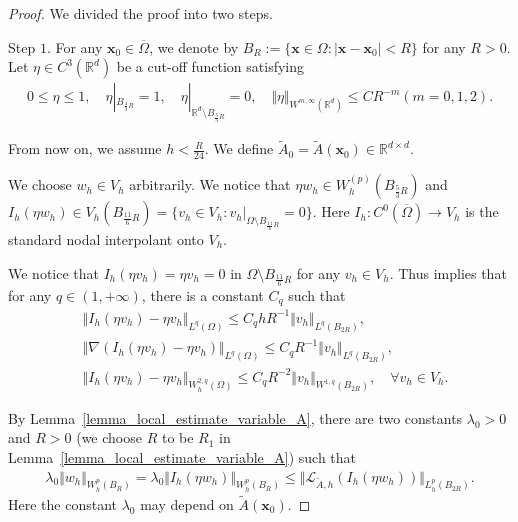 \documentclass[12pt]{amsart}
\newcommand{\boldx}{\boldsymbol{x}}
\theoremstyle{definition}
\theoremstyle{remark}
\begin{document}
\begin{proof}
We divided the proof into two steps.

Step $1$. For any $\boldx_{0} \in \overline{\Omega}$, we denote by $B_{R}:=\{ \boldx \in \Omega: 
\vert \boldx - \boldx_{0} \vert < R \}$ for any $R > 0$. Let $\eta \in C^{3}(\mathbb{R}^{d})$ be 
a cut-off function satisfying 
\begin{align}
\label{cut_off_func}
0\leq \eta \leq 1, \quad \eta|_{B_{\frac{4}{3}R}} = 1, \quad \eta|_{\mathbb{R}^{d} \setminus B_{\frac{5}{3}R}} = 0, 
\quad \Vert \eta \Vert_{W^{m,\infty}(\mathbb{R}^{d})} \leq C R^{-m} (m=0,1,2).
\end{align} 

From now on, we assume $h < \frac{R}{24}$. We define $\tilde{A}_{0} = \tilde{A}(\boldx_{0})\in \mathbb{R}^{d \times d}$. 

We choose $w_{h} \in V_{h}$ arbitrarily. We notice that $\eta w_{h} \in W_{h}^{(p)}(B_{\frac{5}{3}R})$ 
and $I_{h}(\eta w_{h}) \in V_{h}(B_{\frac{11}{6}R})=\{ v_{h} \in V_{h} : v_{h}|_{\Omega \setminus B_{\frac{11}{6} R}} = 0 \}$. 
Here $I_{h}: C^{0}(\overline{\Omega})\rightarrow V_{h}$ is the standard nodal interpolant onto $V_{h}$.

We notice that $I_{h}(\eta v_{h}) = \eta v_{h} = 0$ in $\Omega \setminus B_{\frac{11}{6}R}$ for any $v_{h} \in V_{h}$. 
Thus \cite[Lemma~$2.4$]{FHM2017} implies that for any $q \in (1, +\infty)$, there is a constant $C_{q}$ such that 
\begin{align}
\label{nodal_interpolation_error}
& \Vert I_{h}(\eta v_{h}) - \eta v_{h} \Vert_{L^{q}(\Omega)} \leq C_{q} h R^{-1} \Vert v_{h}\Vert_{L^{q}(B_{2R})},\\
\nonumber
& \Vert \nabla (I_{h}(\eta v_{h}) -\eta v_{h} ) \Vert_{L^{q}(\Omega)} 
\leq C_{q}R^{-1} \Vert v_{h} \Vert_{L^{q}( B_{2R} )}, \\
\nonumber
& \Vert I_{h}(\eta v_{h}) - \eta v_{h}\Vert_{W_{h}^{2,q}(\Omega)} 
\leq C_{q} R^{-2}\Vert v_{h} \Vert_{W^{1,q}(B_{2R})},
\quad \forall v_{h} \in V_{h}.
\end{align}

By Lemma~\ref{lemma_local_estimate_variable_A}, there are two constants $\lambda_{0}>0$ and $R > 0$ 
(we choose $R$ to be $R_{1}$ in Lemma~\ref{lemma_local_estimate_variable_A}) such that 
\begin{align}
\label{gloabl_estimate_with_reaction_ineq1}
\lambda_{0}\Vert w_{h} \Vert_{W_{h}^{p}(B_{R})}  
= \lambda_{0}\Vert I_{h}(\eta w_{h}) \Vert_{W_{h}^{p}(B_{R})} 
\leq \Vert \mathcal{L}_{\tilde{A},h}(I_{h}(\eta w_{h})) \Vert_{L_{h}^{p}(B_{2R})}. 
\end{align}
Here the constant $\lambda_{0}$ may depend on $\tilde{A}(\boldx_{0})$. 


\end{proof}
\end{document}
